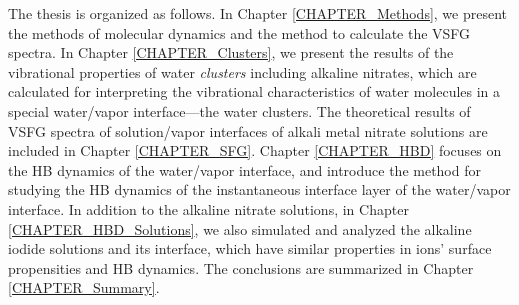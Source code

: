 The thesis is organized as follows. 
In Chapter \ref{CHAPTER_Methods}, we present the methods of \abinitio molecular dynamics
and the method to calculate the VSFG spectra.
In Chapter \ref{CHAPTER_Clusters}, we present the results of the vibrational properties of water \emph{clusters} including alkaline nitrates, 
which are calculated for interpreting the vibrational characteristics of water molecules in a special water/vapor interface---the water clusters.
The theoretical results of VSFG spectra of solution/vapor interfaces of alkali metal nitrate solutions are included in Chapter \ref{CHAPTER_SFG}. 
Chapter \ref{CHAPTER_HBD} focuses on the HB dynamics of the water/vapor interface, 
and introduce the method for studying the HB dynamics of the instantaneous interface layer of the water/vapor interface.
In addition to the alkaline nitrate solutions, in Chapter \ref{CHAPTER_HBD_Solutions}, we also simulated and analyzed the alkaline iodide solutions and its interface, which have similar properties in ions' surface propensities and HB dynamics. 
The conclusions are summarized in Chapter \ref{CHAPTER_Summary}.
